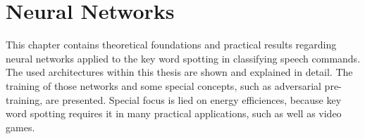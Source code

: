 
\chapter{Neural Networks}\label{sec:nn}
This chapter contains theoretical foundations and practical results regarding neural networks applied to the key word spotting in classifying speech commands.
The used architectures within this thesis are shown and explained in detail.
The training of those networks and some special concepts, such as adversarial pre-training, are presented.
Special focus is lied on energy efficiences, because key word spotting requires it in many practical applications, such as well as video games.






